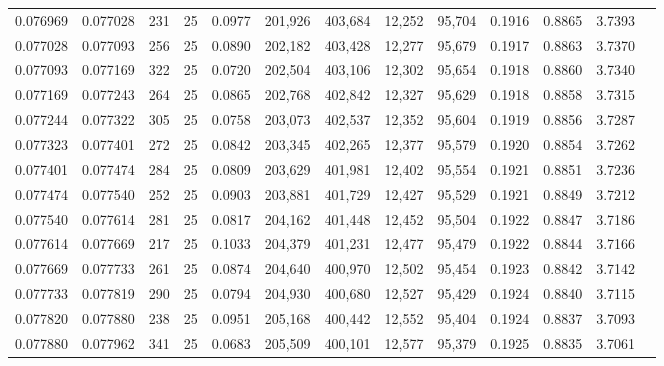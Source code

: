 \begin{tabular}{rrrrrrrrrrrrr}
0.076969 & 0.077028 &   231 &  25 &                                     0.0977 & 201,926 & 403,684 &  12,252 &  95,704 & 0.1916 & 0.8865 & 3.7393 \\
0.077028 & 0.077093 &   256 &  25 &                                     0.0890 & 202,182 & 403,428 &  12,277 &  95,679 & 0.1917 & 0.8863 & 3.7370 \\
0.077093 & 0.077169 &   322 &  25 &                                     0.0720 & 202,504 & 403,106 &  12,302 &  95,654 & 0.1918 & 0.8860 & 3.7340 \\
0.077169 & 0.077243 &   264 &  25 &                                     0.0865 & 202,768 & 402,842 &  12,327 &  95,629 & 0.1918 & 0.8858 & 3.7315 \\
0.077244 & 0.077322 &   305 &  25 &                                     0.0758 & 203,073 & 402,537 &  12,352 &  95,604 & 0.1919 & 0.8856 & 3.7287 \\
0.077323 & 0.077401 &   272 &  25 &                                     0.0842 & 203,345 & 402,265 &  12,377 &  95,579 & 0.1920 & 0.8854 & 3.7262 \\
0.077401 & 0.077474 &   284 &  25 &                                     0.0809 & 203,629 & 401,981 &  12,402 &  95,554 & 0.1921 & 0.8851 & 3.7236 \\
0.077474 & 0.077540 &   252 &  25 &                                     0.0903 & 203,881 & 401,729 &  12,427 &  95,529 & 0.1921 & 0.8849 & 3.7212 \\
0.077540 & 0.077614 &   281 &  25 &                                     0.0817 & 204,162 & 401,448 &  12,452 &  95,504 & 0.1922 & 0.8847 & 3.7186 \\
0.077614 & 0.077669 &   217 &  25 &                                     0.1033 & 204,379 & 401,231 &  12,477 &  95,479 & 0.1922 & 0.8844 & 3.7166 \\
0.077669 & 0.077733 &   261 &  25 &                                     0.0874 & 204,640 & 400,970 &  12,502 &  95,454 & 0.1923 & 0.8842 & 3.7142 \\
0.077733 & 0.077819 &   290 &  25 &                                     0.0794 & 204,930 & 400,680 &  12,527 &  95,429 & 0.1924 & 0.8840 & 3.7115 \\
0.077820 & 0.077880 &   238 &  25 &                                     0.0951 & 205,168 & 400,442 &  12,552 &  95,404 & 0.1924 & 0.8837 & 3.7093 \\
0.077880 & 0.077962 &   341 &  25 &                                     0.0683 & 205,509 & 400,101 &  12,577 &  95,379 & 0.1925 & 0.8835 & 3.7061 \\

\end{tabular}
